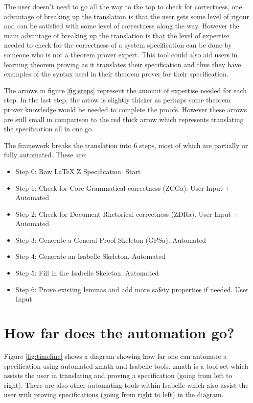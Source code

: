 The user doesn't need to go all the way to the top to check for correctness, one
advantage of breaking up the translation is that the user gets some level of
rigour and can be satisfied with some level of correctness along the way.
However the main advantage of breaking up the translation is that the level of
expertise needed to check for the correctness of a system specification can be
done by someone who is not a theorem prover expert. This tool could also aid
users in learning theorem proving as it translates their specification and thus
they have examples of the syntax used in their theorem prover for their
specification. 

The arrows in figure \ref{fig:steps} represent the amount of expertise needed
for each step. In the last step, the arrow is slightly thicker as perhaps some
theorem prover knowledge would be needed to complete the proofs. However these
arrows are still small in comparison to the red thick arrow which represents
translating the specification all in one go.

The framework breaks the translation into 6 steps, most of which are partially
or fully automated. These are:

\begin{itemize}
\item Step 0: Raw LaTeX Z Specification. {\color{set}Start}
\item Step 1: Check for Core Grammatical correctness (ZCGa). {\color{set}User Input + Automated}
\item Step 2: Check for Document Rhetorical correctness (ZDRa). {\color{set}User Input + Automated}
\item Step 3: Generate a General Proof Skeleton (GPSa). {\color{set}Automated}
\item Step 4: Generate an Isabelle Skeleton. {\color{set}Automated}
\item Step 5: Fill in the Isabelle Skeleton. {\color{set}Automated}
\item Step 6: Prove existing lemmas and add more safety properties if needed. {\color{set}User Input}
\end{itemize}

\section{How far does the automation go?}

Figure \ref{fig:timeline} shows a diagram showing how far one can automate a
specification using automated \gls{zmath} and Isabelle tools. \Gls{zmath} is a
tool-set which assists the user in translating and proving a specification (going
from left to right). There are also other automating tools within Isabelle which
also assist the user with proving specifications (going from right to left) in
the diagram.

